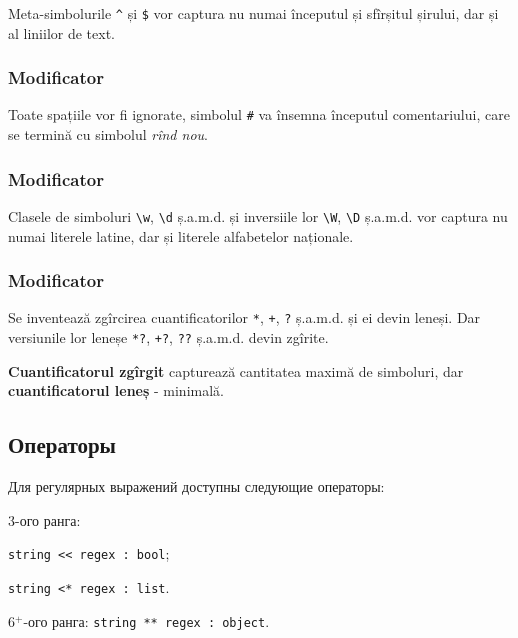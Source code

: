 Meta-simbolurile \lstinline|^| și \lstinline|$| vor captura nu numai începutul și sfîrșitul șirului, dar și al liniilor de text.

\subsubsection{Modificator }

Toate spațiile vor fi ignorate, simbolul \lstinline|#| va însemna începutul comentariului, care se termină cu simbolul {\it rînd nou}.

\subsubsection{Modificator }

Clasele de simboluri \lstinline|\w|, \lstinline|\d| ș.a.m.d. și inversiile lor \lstinline|\W|, \lstinline|\D| ș.a.m.d. vor captura nu numai literele latine, dar și literele alfabetelor naționale.

\subsubsection{Modificator }

Se inventează zgîrcirea cuantificatorilor \lstinline|*|, \lstinline|+|, \lstinline|?| ș.a.m.d. și ei devin leneși. Dar versiunile lor leneșe \lstinline|*?|, \lstinline|+?|, \lstinline|??| ș.a.m.d. devin zgîrite.

{\bf Cuantificatorul zgîrgit} capturează cantitatea maximă de simboluri, dar {\bf cuantificatorul leneș} - minimală.

\subsection{Операторы}

Для регулярных выражений доступны следующие операторы:
\begin{icItems}
\item
	3-ого ранга:
	\begin{icItems}
	\item
		\lstinline|string << regex : bool|;
	\item
		\lstinline|string <* regex : list|.
	\end{icItems}

\item 
	6$^+$-ого ранга: \lstinline|string ** regex : object|.
\end{icItems}

